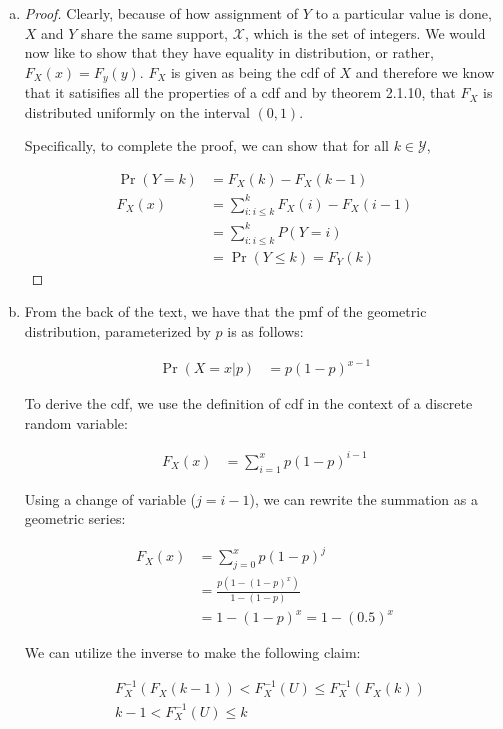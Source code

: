 \documentclass[11pt]{article}
\begin{document}
\begin{enumerate}[(a)]
  \item 
    \begin{proof}
      Clearly, because of how assignment of $Y$ to a particular value is done, $X$ and $Y$ share the same support, $\mathcal{X}$, which is the set of integers.  We would now like to show that they have equality in distribution, or rather, $F_X(x) = F_y(y)$.  $F_X$ is given as being the cdf of $X$ and therefore we know that it satisifies all the properties of a cdf and by theorem 2.1.10, that $F_X$ is distributed uniformly on the interval $(0,1)$.

      Specifically, to complete the proof, we can show that for all $k \in \mathcal{Y}$,

      \begin{align*}
        \Pr(Y = k) &= F_X(k) - F_X(k-1) \\
        F_X(x) &= \sum_{i:i \le k}^k F_X(i) - F_X(i-1) \\
        &= \sum_{i:i \le k}^k P(Y=i) \\
        &= \Pr(Y \le k) = F_Y(k)
      \end{align*}
    \end{proof}
  \item From the back of the text, we have that the pmf of the geometric distribution, parameterized by $p$ is as follows:

    \begin{align*}
      \Pr(X = x | p) &= p(1-p)^{x-1}
    \end{align*}

    To derive the cdf, we use the definition of cdf in the context of a discrete random variable:
 
    \begin{align*}
      F_X(x) &= \sum_{i=1}^x p(1-p)^{i-1}
    \end{align*}

    Using a change of variable ($j=i-1$), we can rewrite the summation as a geometric series:

    \begin{align*}
      F_X(x) &= \sum_{j=0}^x p(1-p)^j \\
      &= \frac{p(1-(1-p)^x)}{1 - (1-p)} \\
      &= 1 - (1-p)^x = 1 - (0.5)^x
    \end{align*}

    We can utilize the inverse to make the following claim:

    \begin{align*}
      & F_X^{-1}(F_X(k-1)) < F_X^{-1}(U) \le F_X^{-1}(F_X(k)) \\
      & k-1 < F_X^{-1}(U) \le k
    \end{align*}


\end{enumerate}
\end{document}
